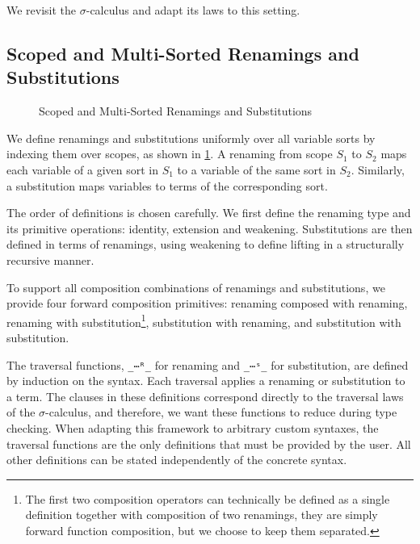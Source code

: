 \documentclass[screen,nonacm]{acmart}
\begin{document}
We revisit the $\sigma$-calculus and adapt its laws to this setting.

\subsection{Scoped and Multi-Sorted Renamings and Substitutions}\label{sec:mis-sub}
\begin{figure}[t]
      \centering
      \begin{minipage}[t]{0.48\linewidth}
            \raggedright{}
            \ERen{}
      \end{minipage}
      \hfill
      \begin{minipage}[t]{0.48\linewidth}
            \raggedright{}
            \ESub{}
      \end{minipage}
      \caption{Scoped and Multi-Sorted Renamings and Substitutions}
      \label{fig:mis:ras}
\end{figure}

We define renamings and substitutions uniformly over all variable sorts by
indexing them over scopes, as shown in \cref{fig:mis:ras}. A renaming from
scope $S_1$ to $S_2$ maps each variable of a given sort in $S_1$ to a variable
of the same sort in $S_2$. Similarly, a substitution maps variables to terms of
the corresponding sort.

The order of definitions is chosen carefully. We first define the renaming type
and its primitive operations: identity, extension and weakening. Substitutions
are then defined in terms of renamings, using weakening to define lifting in a
structurally recursive manner.

To support all composition combinations of renamings and substitutions, we
provide four forward composition primitives: renaming composed with renaming,
renaming with substitution\footnote{The first two composition operators can
      technically be defined as a single definition together with composition of two
      renamings, they are simply forward function composition, but we choose to keep
      them separated.}, substitution with renaming, and substitution with
substitution.

The traversal functions, \texttt{\_⋯ᴿ\_} for renaming and \texttt{\_⋯ˢ\_} for
substitution, are defined by induction on the syntax. Each traversal applies a
renaming or substitution to a term. The clauses in these definitions correspond
directly to the traversal laws of the $\sigma$-calculus, and therefore, we want
these functions to reduce during type checking. When adapting this framework to
arbitrary custom syntaxes, the traversal functions are the only definitions
that must be provided by the user. All other definitions can be stated
independently of the concrete syntax.
\end{document}
